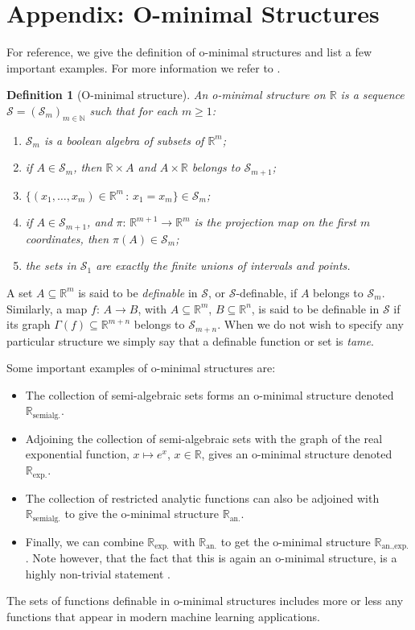 \documentclass{article}
\newtheorem{definition}{Definition}
\newcommand{\CS}{\mathcal{S}}
\newcommand{\BR}{\mathbb{R}}
\newcommand{\BN}{\mathbb{N}}
\newcommand{\Rexp}{\BR_{\text{exp.}}}
\newcommand{\Ran}{\BR_{\text{an.}}}
\newcommand{\Ranexp}{\BR_{\text{an.,exp.}}}
\newcommand{\Ralg}{\BR_{\text{semialg.}}}
\begin{document}
\section{Appendix: O-minimal Structures}\label{sec:ominimal}
For reference, we give the definition of o-minimal structures and list a few important examples. For more information we refer to \cite{van1998tame, Dries1996GeometricCA}.

\begin{definition}[O-minimal structure]
	    An o-minimal structure on $\BR$ is a sequence $\CS=(\CS_m)_{m\in\BN}$ such that for each $m\geq 1$:
	    \begin{enumerate}\setlength\itemsep{0.5em}
	        \item[{1)}] $\CS_m$ is a boolean algebra of subsets of $\BR^m$;
	        \item[{2)}] if $A\in\CS_m$, then $\BR\times A$ and $A\times \BR$ belongs to $\CS_{m+1}$;
	        \item[{3)}] $\{(x_1,\dots,x_m)\in \BR^m\,:\, x_1=x_m\}\in \CS_m$;
	        \item[{4)}] if $A\in\CS_{m+1}$, and $\pi:\,\BR^{m+1}\to\BR^m$ is the projection map on the first $m$ coordinates, then $\pi(A)\in\CS_m$;
                \item[{5)}] the sets in $\CS_1$ are exactly the finite unions of intervals and points. 
	    \end{enumerate}
	\end{definition} 
	
A set $A\subseteq \BR^m$ is said to be \emph{definable} in $\CS$, or $\CS$-definable, if $A$ belongs to $\CS_m$. Similarly, a map $f:\, A\to B$, with $A\subseteq \BR^m$, $B\subseteq \BR^n$, is said to be definable in $\CS$ if its graph $\Gamma(f)\subseteq \BR^{m+n}$ belongs to $\CS_{m+n}$. When we do not wish to specify any particular structure we simply say that a definable function or set is \emph{tame}. 

Some important examples of o-minimal structures are:

\begin{itemize}
    \item The collection of semi-algebraic sets forms an o-minimal structure denoted $\Ralg$.

    \item Adjoining the collection of semi-algebraic sets with the graph of the real exponential function, $x\mapsto e^x$, $x\in\BR$, gives an o-minimal structure denoted $\Rexp$.

    \item The collection of restricted analytic functions can also be adjoined with $\Ralg$ to give the o-minimal structure $\Ran$. 

    \item Finally, we can combine $\Rexp$ with $\Ran$ to get the o-minimal structure $\Ranexp$. Note however, that the fact that this is again an o-minimal structure, is a highly non-trivial statement \cite{wilkie1996model}. 
\end{itemize}

The sets of functions definable in o-minimal structures includes more or less any functions that appear in modern machine learning applications. 

\end{document}
